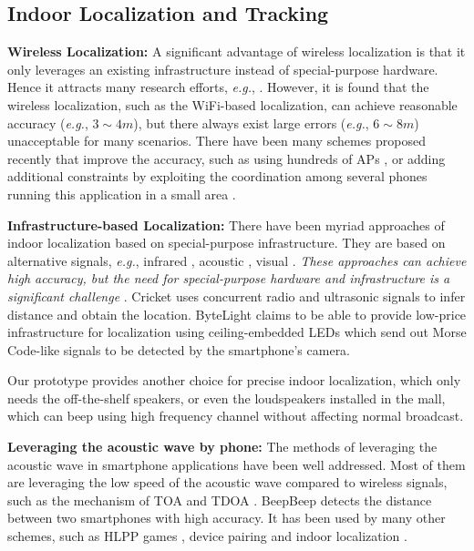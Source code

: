 \documentclass[]{sig-alternate-10pt}
\def\eg{\textit{e.g.}\xspace}
\begin{document}
\subsection{Indoor Localization and Tracking}
\noindent\textbf{Wireless Localization:} 
A significant advantage of wireless
localization is that it only leverages an existing infrastructure
instead of special-purpose hardware. Hence it attracts many research
efforts, \eg, \cite{Youssef:2005:HWL:1067170.1067193
,DBLP:conf/infocom/BahlP00,2010-MOBICOM-Didyousee,2012-MOBICOM-Locatinginfingerprint,2012-MOBICOM-PushlimitWiFi,2012-MOBICOM-Zeezeroeffort}.
However, it is found \cite{2012-MOBICOM-PushlimitWiFi} that the
wireless localization, such as the WiFi-based localization, can
achieve reasonable accuracy (\eg, $3\sim4m$), but there always exist
large errors (\eg, $6\sim8m$) unacceptable for many scenarios.  There
have  been many schemes proposed recently that improve the accuracy, such as using hundreds of APs \cite{5168931}, or adding
additional constraints by  
  exploiting the coordination among several phones 
 running this application in a small area \cite{2012-MOBICOM-PushlimitWiFi}.

\noindent\textbf{Infrastructure-based Localization:} 
There have been myriad approaches of indoor localization based on
special-purpose 
infrastructure. They are based on alternative signals, \eg,  
infrared \cite{Want:1992:ABL:128756.128759}, acoustic
\cite{626982}, visual
\cite{DBLP:journals/trob/SeLL05}. \textit{These approaches can
achieve high accuracy, but the need for special-purpose hardware and
infrastructure is a significant challenge} \cite{2012-MOBICOM-Zeezeroeffort}.
Cricket \cite{Priyantha:2000:CLS:345910.345917} uses concurrent radio
and ultrasonic signals to infer distance and obtain the location. 
ByteLight \cite{byteLight} claims to be able to provide low-price
infrastructure for localization using 
ceiling-embedded LEDs which send out Morse Code-like  signals
to be detected by the smartphone's camera. 

Our prototype provides another choice for precise indoor localization,
which only needs the off-the-shelf speakers,  or
even the loudspeakers installed in the mall, which can beep using high
frequency channel  without affecting normal broadcast. 

\noindent\textbf{Leveraging the acoustic wave by phone:} 
The methods of leveraging the acoustic wave in smartphone
applications have been well addressed. Most of them are leveraging the
low speed of the acoustic wave compared to wireless signals, such as
the mechanism of TOA \cite{2007-SenSys-BeepBeephighaccuracy} and TDOA \cite{DBLP:conf/mobicom/YangSCVLCCGM11}. BeepBeep
\cite{2007-SenSys-BeepBeephighaccuracy} detects the distance
 between two smartphones with  high accuracy. 
It has been used by many other schemes, such
 as HLPP games
\cite{2011-SenSys-feasibilityrealtime,2012-MobiSys-SwordFightenablingnew},
device pairing \cite{2009-MobiSys-Point&Connectintentionbased} and indoor localization
\cite{2012-MOBICOM-PushlimitWiFi,2012-MOBICOM-Centaurlocatingdevices}.
\end{document}
